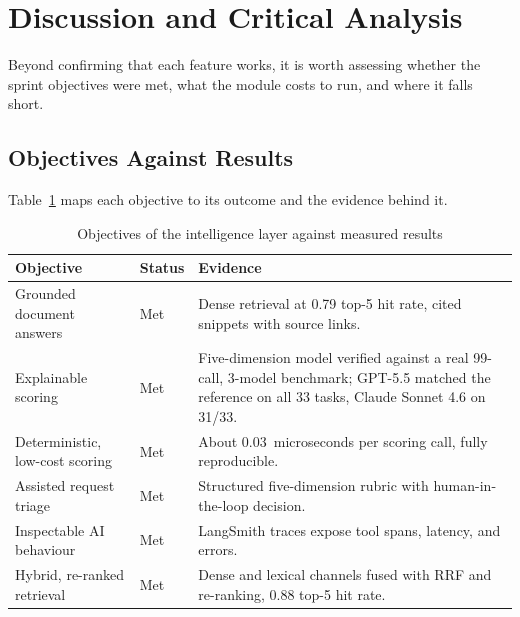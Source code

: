 \section{Discussion and Critical Analysis}
\label{sec:chapter7-discussion}
Beyond confirming that each feature works, it is worth assessing whether the sprint objectives were met, what the module costs to run, and where it falls short.
\subsection{Objectives Against Results}
\label{subsec:chapter7-objectives-results}
Table~\ref{tab:chapter7-objectives-scorecard} maps each objective to its outcome and the evidence behind it.
\begin{table}[H]
  \centering
  \caption{Objectives of the intelligence layer against measured results}
  \label{tab:chapter7-objectives-scorecard}
  \footnotesize
  \begin{tabularx}{\linewidth}{>{\raggedright\arraybackslash}p{3.2cm}>{\raggedright\arraybackslash}p{1.9cm}X}
    \toprule
    \textbf{Objective} & \textbf{Status} & \textbf{Evidence} \\
    \midrule
    Grounded document answers & Met & Dense retrieval at 0.79 top-5 hit rate, cited snippets with source links. \\
    Explainable scoring & Met & Five-dimension model verified against a real 99-call, 3-model benchmark; GPT-5.5 matched the reference on all 33 tasks, Claude Sonnet 4.6 on 31/33. \\
    Deterministic, low-cost scoring & Met & About 0.03~microseconds per scoring call, fully reproducible. \\
    Assisted request triage & Met & Structured five-dimension rubric with human-in-the-loop decision. \\
    Inspectable AI behaviour & Met & LangSmith traces expose tool spans, latency, and errors. \\
    Hybrid, re-ranked retrieval & Met & Dense and lexical channels fused with RRF and re-ranking, 0.88 top-5 hit rate. \\
    \bottomrule
  \end{tabularx}
\end{table}
